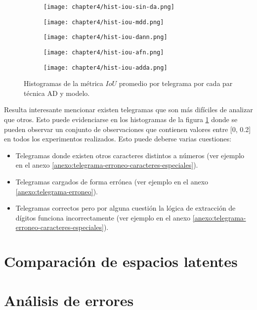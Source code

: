 \begin{figure}[H]
    \centering
    \begin{subfigure}[h]{0.43\textwidth}
        \texttt{[image: chapter4/hist-iou-sin-da.png]}
    \end{subfigure}
    \hfill
    \begin{subfigure}[h]{0.43\textwidth}
        \texttt{[image: chapter4/hist-iou-mdd.png]}
    \end{subfigure}
    \hfill
    \begin{subfigure}[h]{0.43\textwidth}
        \texttt{[image: chapter4/hist-iou-dann.png]}
    \end{subfigure}
    \hfill
    \begin{subfigure}[h]{0.43\textwidth}
        \texttt{[image: chapter4/hist-iou-afn.png]}
    \end{subfigure}
    \hfill
    \begin{subfigure}[h]{0.43\textwidth}
        \texttt{[image: chapter4/hist-iou-adda.png]}
    \end{subfigure}

    \caption{Histogramas de la m\'etrica $IoU$ promedio por telegrama por cada par t\'ecnica AD y modelo.}
    \label{fig:histogramas-ious}
\end{figure}

Resulta interesante mencionar existen telegramas que son m\'as dif\'iciles de analizar que otros. Esto puede
evidenciarse en los histogramas de la figura \ref{fig:histogramas-ious} donde se pueden observar un conjunto de
observaciones que contienen valores entre [0, 0.2] en todos los experimentos realizados. Esto puede deberse varias
cuestiones:

\begin{itemize}
    \item Telegramas donde existen otros caracteres distintos a n\'umeros (ver ejemplo en el anexo
          \ref{anexo:telegrama-erroneo-caracteres-especiales}).
    \item Telegramas cargados de forma err\'onea (ver ejemplo en el anexo \ref{anexo:telegrama-erroneo}).
    \item Telegramas correctos pero por alguna cuesti\'on la l\'ogica de extracci\'on de d\'igitos funciona incorrectamente (ver
          ejemplo en el anexo \ref{anexo:telegrama-erroneo-caracteres-especiales}).
\end{itemize}

\section{Comparaci\'on de espacios latentes}

\lipsum[1]

\section{An\'alisis de errores}

\lipsum[1]